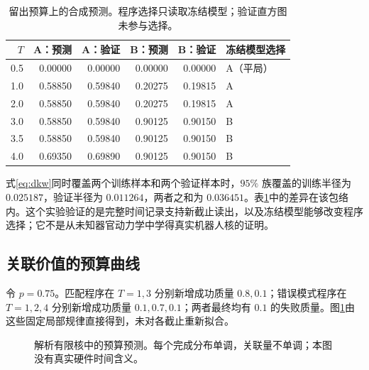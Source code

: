 \documentclass[11pt,a4paper,fontset=fandol]{ctexart}
\theoremstyle{definition}
\theoremstyle{remark}
\numberwithin{equation}{section}
\begin{document}
\begin{table}[htbp]\centering\small
\begin{tabular}{rrrrrl}
\toprule
$T$ & A：预测 & A：验证 & B：预测 & B：验证 & 冻结模型选择\\ \midrule
0.5 & 0.00000 & 0.00000 & 0.00000 & 0.00000 & A（平局）\\
1.0 & 0.58850 & 0.59840 & 0.20275 & 0.19815 & A\\
2.0 & 0.58850 & 0.59840 & 0.20275 & 0.19815 & A\\
3.0 & 0.58850 & 0.59840 & 0.90125 & 0.90150 & B\\
3.5 & 0.58850 & 0.59840 & 0.90125 & 0.90150 & B\\
4.0 & 0.69350 & 0.69890 & 0.90125 & 0.90150 & B\\
\bottomrule
\end{tabular}
\caption{留出预算上的合成预测。程序选择只读取冻结模型；验证直方图未参与选择。}
\label{tab:heldout}
\end{table}

式\eqref{eq:dkw}同时覆盖两个训练样本和两个验证样本时，$95\%$ 族覆盖的训练半径为 $0.025187$，验证半径为 $0.011264$，两者之和为 $0.036451$。表\ref{tab:heldout}中的差异在该包络内。这个实验验证的是完整时间记录支持新截止读出，以及冻结模型能够改变程序选择；它不是从未知器官动力学中学得真实机器人核的证明。

\subsection{关联价值的预算曲线}
令 $p=0.75$。匹配程序在 $T=1,3$ 分别新增成功质量 $0.8,0.1$；错误模式程序在 $T=1,2,4$ 分别新增成功质量 $0.1,0.7,0.1$；两者最终均有 $0.1$ 的失败质量。图\ref{fig:gamma}由这些固定局部规律直接得到，未对各截止重新拟合。

\begin{figure}[htbp]\centering
{}
\caption{解析有限核中的预算预测。每个完成分布单调，关联量不单调；本图没有真实硬件时间含义。}
\label{fig:gamma}
\end{figure}
\end{document}
